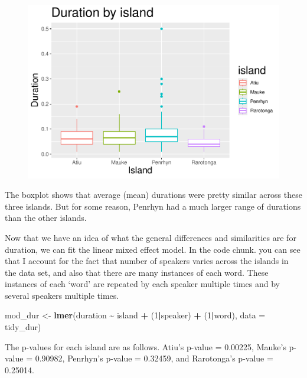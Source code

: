 \documentclass[
  ,man,floatsintext]{apa6}
\newenvironment{Shaded}{\begin{snugshade}}{\end{snugshade}}
\newcommand{\AttributeTok}[1]{\textcolor[rgb]{0.13,0.29,0.53}{#1}}
\newcommand{\DecValTok}[1]{\textcolor[rgb]{0.00,0.00,0.81}{#1}}
\newcommand{\FunctionTok}[1]{\textcolor[rgb]{0.13,0.29,0.53}{\textbf{#1}}}
\newcommand{\NormalTok}[1]{#1}
\newcommand{\OtherTok}[1]{\textcolor[rgb]{0.56,0.35,0.01}{#1}}
\newcommand{\SpecialCharTok}[1]{\textcolor[rgb]{0.81,0.36,0.00}{\textbf{#1}}}
\begin{document}
\begin{figure}

{\centering \includegraphics[width=0.75\linewidth]{D2_CIM_files/figure-latex/print-duration-plot-1} 

}

\caption{ }\label{fig:print-duration-plot}
\end{figure}

The boxplot shows that average (mean) durations were pretty similar across these three islands. But for some reason, Penrhyn had a much larger range of durations than the other islands.

Now that we have an idea of what the general differences and similarities are for duration, we can fit the linear mixed effect model. In the code chunk. you can see that I account for the fact that number of speakers varies across the islands in the data set, and also that there are many instances of each word. These instances of each `word' are repeated by each speaker multiple times and by several speakers multiple times.

\begin{Shaded}
\begin{Highlighting}[]
\NormalTok{mod\_dur }\OtherTok{\textless{}{-}} \FunctionTok{lmer}\NormalTok{(duration }\SpecialCharTok{\textasciitilde{}}\NormalTok{ island }\SpecialCharTok{+}\NormalTok{ (}\DecValTok{1}\SpecialCharTok{|}\NormalTok{speaker) }\SpecialCharTok{+}\NormalTok{ (}\DecValTok{1}\SpecialCharTok{|}\NormalTok{word), }\AttributeTok{data =}\NormalTok{ tidy\_dur)}
\end{Highlighting}
\end{Shaded}

The p-values for each island are as follows. Atiu's p-value = 0.00225, Mauke's p-value = 0.90982, Penrhyn's p-value = 0.32459, and Rarotonga's p-value = 0.25014.
\end{document}
